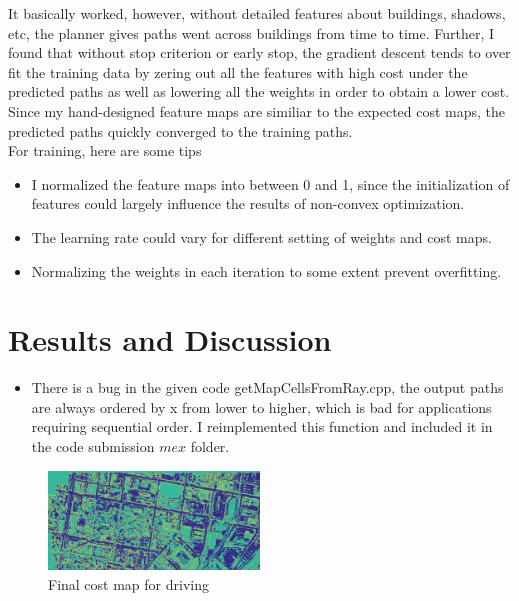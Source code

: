 \documentclass[letterpaper,twocolumn,10pt]{article}
\begin{document}
It basically worked, however, without detailed features about buildings, shadows, etc, the planner gives paths went across buildings from time to time. Further, I found that without stop criterion or early stop, the gradient descent tends to over fit the training data by zering out all the features with high cost under the predicted paths as well as lowering all the weights in order to obtain a lower cost.\\Since my hand-designed feature maps are similiar to the expected cost maps, the predicted paths quickly converged to the training paths.\\
For training, here are some tips\\
\begin{itemize}
\item I normalized the feature maps into between 0 and 1, since the initialization of features could largely influence the results of non-convex optimization.
\item The learning rate could vary for different setting of weights and cost maps.
\item Normalizing the weights in each iteration to some extent prevent overfitting.
\end{itemize}

\section{Results and Discussion}

\begin{itemize}
\item There is a bug in the given code getMapCellsFromRay.cpp, the output paths are always ordered by x from lower to higher, which is bad for applications requiring sequential order. I reimplemented this function and included it in the code submission $mex$ folder. 
\end{itemize}


\begin{figure}[h]
    \centering
    \includegraphics[width=0.5\textwidth]{results/cost_drive.jpg}
    \caption{Final cost map for driving}
\end{figure}
\end{document}
